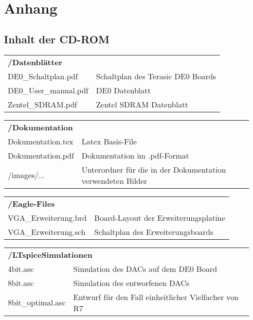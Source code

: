 \chapter{Anhang}
\label{cha:Anhang}

\section*{Inhalt der CD-ROM}

\begin{table}[h!]
\setlength{\tabcolsep}{1ex}
\def\arraystretch{1.20}
\setlength{\tabcolsep}{1ex}
\small
\begin{tabular}{p{5cm}l}
\multicolumn{2}{l}{\textbf{/Datenblätter}}\\
DE0\_Schaltplan.pdf & Schaltplan des Terasic DE0 Boards \\ 
DE0\_User\_manual.pdf & DE0 Datenblatt \\
Zentel\_SDRAM.pdf & Zentel SDRAM Datenblatt\\
\end{tabular} 
\end{table}

\begin{table}[h!]
\setlength{\tabcolsep}{1ex}
\def\arraystretch{1.20}
\setlength{\tabcolsep}{1ex}
\small
\begin{tabular}{p{5cm}l}
\multicolumn{2}{l}{\textbf{/Dokumentation}}\\
Dokumentation.tex & Latex Basis-File \\ 
Dokumentation.pdf & Dokumentation im .pdf-Format \\
/images/... & Unterordner für die in der Dokumentation verwendeten Bilder\\
\end{tabular} 
\end{table}

\begin{table}[h!]
\setlength{\tabcolsep}{1ex}
\def\arraystretch{1.20}
\setlength{\tabcolsep}{1ex}
\small
\begin{tabular}{p{5cm}l}
\multicolumn{2}{l}{\textbf{/Eagle-Files}}\\
VGA\_Erweiterung.brd & Board-Layout der Erweiterungsplatine \\ 
VGA\_Erweiterung.sch & Schaltplan des Erweiterungsboards \\
\end{tabular} 
\end{table}

\begin{table}[h!]
\setlength{\tabcolsep}{1ex}
\def\arraystretch{1.20}
\setlength{\tabcolsep}{1ex}
\small
\begin{tabular}{p{5cm}l}
\multicolumn{2}{l}{\textbf{/LTspiceSimulationen}}\\
4bit.asc & Simulation des DACs auf dem DE0 Board \\ 
8bit.asc & Simulation des entworfenen DACs \\
8bit\_optimal.asc & Entwurf für den Fall einheitlicher Vielfacher von R7\\
\end{tabular} 
\end{table}

